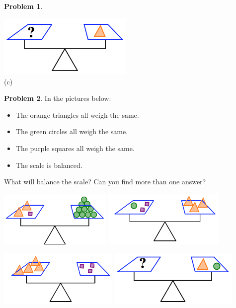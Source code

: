 \documentclass[12pt, reqno]{amsart}
\theoremstyle{remark}
\theoremstyle{definition}
\newtheorem{problem}{Problem}
\numberwithin{equation}{section}  %
\begin{document}
\begin{problem}
\begin{center}
\includegraphics[height=3cm]{balance2d3}\\
(c)

\end{center}

\end{problem}


\newpage


\begin{problem}\label{prob: balance3}
In the pictures below:
\begin{itemize}
\item
The orange triangles all weigh the same.  
\item
The green circles all weigh the same.  
\item
The purple squares all weigh the same.  
\item
The scale is balanced.
\end{itemize}
 What will balance the scale?  Can you find more than one answer?
\begin{center}
\includegraphics[height=2.7cm]{balance3a}\quad
\includegraphics[height=2.7cm]{balance3b}

\bigskip

\includegraphics[height=2.7cm]{balance3c}\quad
\includegraphics[height=2.7cm]{balance3d}

\end{center}

\end{problem}
\end{document}
